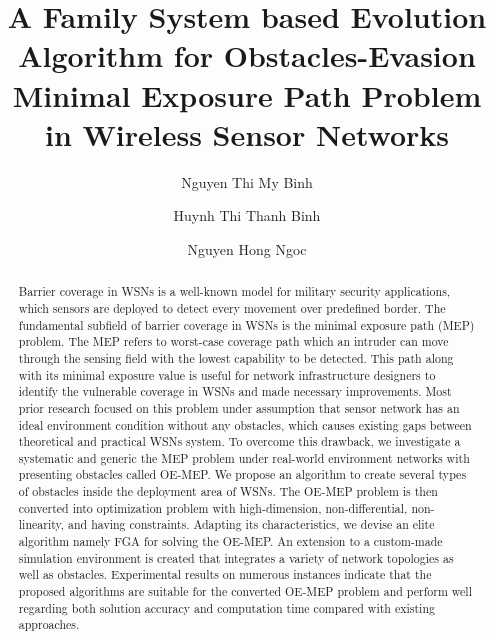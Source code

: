 \documentclass[final]{elsarticle}
\begin{document}
\begin{frontmatter}
\title{A Family System based Evolution Algorithm for Obstacles-Evasion Minimal Exposure Path Problem in Wireless Sensor Networks}

\author[ntmb]{Nguyen Thi My Binh}

\author[httb]{Huynh Thi Thanh Binh}
\author[httb]{Nguyen Hong Ngoc}
\address[ntmb]{Hanoi University of Industry, Vietnam}
\address[httb]{ Hanoi University of Science and Technology, Vietnam}

%
%
\begin{abstract}
Barrier coverage in WSNs is a well-known model for military security applications, which sensors are deployed to detect every movement over predefined border. The fundamental subfield of barrier coverage in WSNs is the minimal exposure path (MEP) problem. The MEP refers to worst-case coverage path which an intruder can move through the sensing field with the lowest capability to be detected. This path along with its minimal exposure value is useful for network infrastructure designers to identify the vulnerable coverage in WSNs and made necessary improvements. Most prior research focused on this problem under assumption that sensor network has an ideal environment condition without any obstacles, which causes existing gaps between theoretical and practical WSNs system. To overcome this drawback, we investigate a systematic and generic the MEP problem under real-world environment networks with presenting obstacles called OE-MEP. We propose an algorithm to create several types of obstacles inside the deployment area of WSNs. The OE-MEP problem is then converted into optimization problem with high-dimension, non-differential, non-linearity, and having constraints. Adapting its characteristics, we devise an elite algorithm namely FGA for solving the OE-MEP. An extension to a custom-made simulation environment is created that integrates a variety of network topologies as well as obstacles. Experimental results on numerous instances indicate that the proposed algorithms are suitable for the converted OE-MEP problem and perform well regarding both solution accuracy and computation time compared with existing approaches.
  

\end{abstract}
\end{frontmatter}
\end{document}
